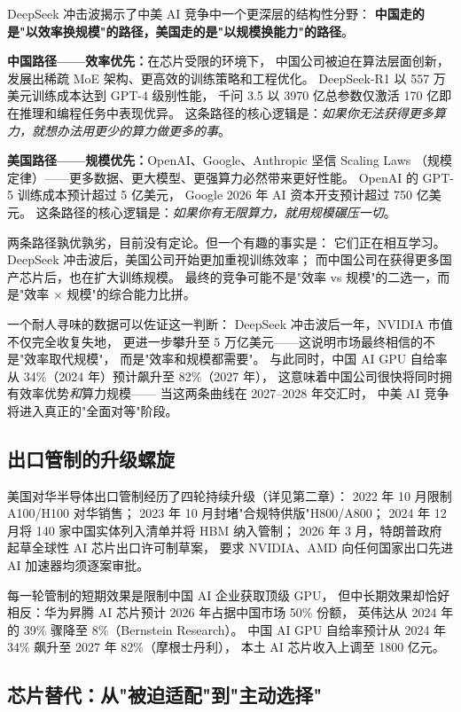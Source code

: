 DeepSeek 冲击波揭示了中美 AI 竞争中一个更深层的结构性分野：
\textbf{中国走的是"以效率换规模"的路径，美国走的是"以规模换能力"的路径}。

\textbf{中国路径——效率优先：}在芯片受限的环境下，
中国公司被迫在算法层面创新，发展出稀疏 MoE 架构、更高效的训练策略和工程优化。
DeepSeek-R1 以 557 万美元训练成本达到 GPT-4 级别性能，
千问 3.5 以 3970 亿总参数仅激活 170 亿即在推理和编程任务中表现优异。
这条路径的核心逻辑是：\textit{如果你无法获得更多算力，就想办法用更少的算力做更多的事}。

\textbf{美国路径——规模优先：}OpenAI、Google、Anthropic 坚信 Scaling Laws
（规模定律）——更多数据、更大模型、更强算力必然带来更好性能。
OpenAI 的 GPT-5 训练成本预计超过 5 亿美元，
Google 2026 年 AI 资本开支预计超过 750 亿美元。
这条路径的核心逻辑是：\textit{如果你有无限算力，就用规模碾压一切}。

两条路径孰优孰劣，目前没有定论。但一个有趣的事实是：
它们正在相互学习。DeepSeek 冲击波后，美国公司开始更加重视训练效率；
而中国公司在获得更多国产芯片后，也在扩大训练规模。
最终的竞争可能不是"效率 vs 规模"的二选一，而是"效率 $\times$ 规模"的综合能力比拼。

一个耐人寻味的数据可以佐证这一判断：
DeepSeek 冲击波后一年，NVIDIA 市值不仅完全收复失地，
更进一步攀升至 5 万亿美元——这说明市场最终相信的不是"效率取代规模"，
而是"效率和规模都需要"。
与此同时，中国 AI GPU 自给率从 34\%（2024 年）预计飙升至 82\%（2027 年），
这意味着中国公司很快将同时拥有效率优势\textit{和}算力规模——
当这两条曲线在 2027--2028 年交汇时，
中美 AI 竞争将进入真正的"全面对等"阶段。

\subsection{出口管制的升级螺旋}
\label{subsec:china-export-controls}

美国对华半导体出口管制经历了四轮持续升级（详见第二章）：
2022 年 10 月限制 A100/H100 对华销售；
2023 年 10 月封堵"合规特供版"H800/A800；
2024 年 12 月将 140 家中国实体列入清单并将 HBM 纳入管制；
2026 年 3 月，特朗普政府起草全球性 AI 芯片出口许可制草案，
要求 NVIDIA、AMD 向任何国家出口先进 AI 加速器均须逐案审批。

每一轮管制的短期效果是限制中国 AI 企业获取顶级 GPU，
但中长期效果却恰好相反：华为昇腾 AI 芯片预计 2026 年占据中国市场 50\% 份额，
英伟达从 2024 年的 39\% 骤降至 8\%（Bernstein Research）。
中国 AI GPU 自给率预计从 2024 年 34\% 飙升至 2027 年 82\%（摩根士丹利），
本土 AI 芯片收入上调至 1800 亿元。

\subsection{芯片替代：从"被迫适配"到"主动选择"}
\label{subsec:china-chip-substitution}

